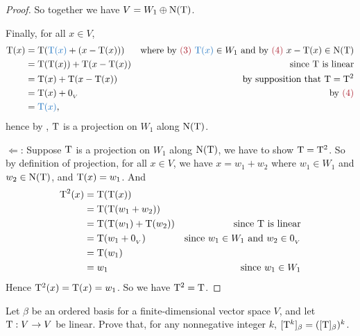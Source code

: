 \begin{proof}
So together we have \(V = W_1 \oplus \mathrm{N(T)}\).

Finally, for all \(x \in V\),
\begin{align*}
    \T(x) & = \T(\BLUE{\T(x)} + (x - \T(x))) & \text{where by \MAROON{(3)} \(\BLUE{\T(x)} \in W_1\) and by \MAROON{(4)} \(x - \T(x) \in \NULLT\)} \\
          & = \T(\T(x)) + \T(x - \T(x)) & \text{since \(\T\) is linear} \\
          & = \T(x) + \T(x - \T(x)) & \text{by supposition that \(\T = \T^2\)} \\
          & = \T(x) + \OV & \text{by \MAROON{(4)}} \\
          & = \BLUE{\T(x)},
\end{align*}
hence by , \(\mathrm{T}\) is a projection on \(W_1\) along \(\mathrm{N(T)}\).

\(\Longleftarrow\): Suppose \(\mathrm{T}\) is a projection on \(W_1\) along \(\mathrm{N(T)}\), we have to show \(\mathrm{T} = \mathrm{T}^2\).
So by definition of projection, for all \(x \in V\), we have \(x = w_1 + w_2\) where \(w_1 \in W_1\) and \(w_2 \in \mathrm{N(T)}\), and \(\mathrm{T}(x) = w_1\).
And
\begin{align*}
    \mathrm{T}^2(x) & = \mathrm{T}(\mathrm{T}(x)) \\
            & = \mathrm{T}(\mathrm{T}(w_1 + w_2)) \\
            & = \mathrm{T}(\mathrm{T}(w_1) + \mathrm{T}(w_2)) & \text{since \(\mathrm{T}\) is linear} \\
            & = \mathrm{T}(w_1 + 0_{_V}) & \text{since \(w_1 \in W_1\) and \(w_2 \in 0_{_V}\)} \\
            & = \mathrm{T}(w_1) \\
            & = w_1 & \text{since \(w_1 \in W_1\)}
\end{align*}
Hence \(\mathrm{T}^2(x) = \mathrm{T}(x) = w_1\).
So we have \(\mathrm{T}^2 = \mathrm{T}\).
\end{proof}

\begin{exercise} \label{exercise 2.3.18}
Let \(\beta\) be an ordered basis for a finite-dimensional vector space \(V\), and let \(\mathrm{T} : V \to V\) be linear.
Prove that, for any nonnegative integer \(k\),
\([\mathrm{T}^k]_{\beta} = ([\mathrm{T}]_{\beta})^k\).
\end{exercise}

